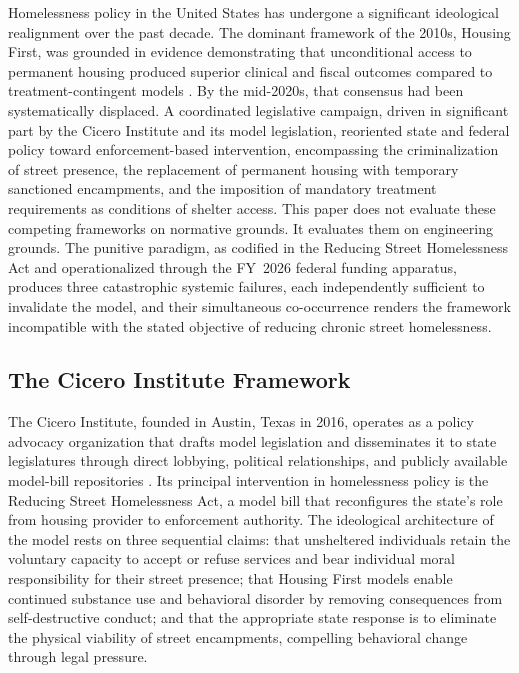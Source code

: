 \documentclass[12pt, letterpaper]{article}
\begin{document}
Homelessness policy in the United States has undergone a significant ideological realignment over the past decade. The dominant framework of the 2010s, Housing First, was grounded in evidence demonstrating that unconditional access to permanent housing produced superior clinical and fiscal outcomes compared to treatment-contingent models \citep{dibella_wp1_2026}. By the mid-2020s, that consensus had been systematically displaced. A coordinated legislative campaign, driven in significant part by the Cicero Institute and its model legislation, reoriented state and federal policy toward enforcement-based intervention, encompassing the criminalization of street presence, the replacement of permanent housing with temporary sanctioned encampments, and the imposition of mandatory treatment requirements as conditions of shelter access. This paper does not evaluate these competing frameworks on normative grounds. It evaluates them on engineering grounds. The punitive paradigm, as codified in the Reducing Street Homelessness Act and operationalized through the FY~2026 federal funding apparatus, produces three catastrophic systemic failures, each independently sufficient to invalidate the model, and their simultaneous co-occurrence renders the framework incompatible with the stated objective of reducing chronic street homelessness.

\subsection{The Cicero Institute Framework}

The Cicero Institute, founded in Austin, Texas in 2016, operates as a policy advocacy organization that drafts model legislation and disseminates it to state legislatures through direct lobbying, political relationships, and publicly available model-bill repositories \citep{cicero_model_bill}. Its principal intervention in homelessness policy is the Reducing Street Homelessness Act, a model bill that reconfigures the state's role from housing provider to enforcement authority. The ideological architecture of the model rests on three sequential claims: that unsheltered individuals retain the voluntary capacity to accept or refuse services and bear individual moral responsibility for their street presence; that Housing First models enable continued substance use and behavioral disorder by removing consequences from self-destructive conduct; and that the appropriate state response is to eliminate the physical viability of street encampments, compelling behavioral change through legal pressure.
\end{document}
